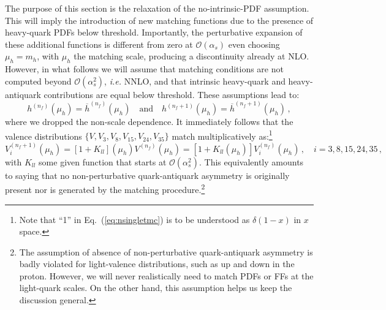 \documentclass[10pt,a4paper]{article}
\begin{document}
The purpose of this section is the relaxation of the no-intrinsic-PDF
assumption. This will imply the introduction of new matching functions
due to the presence of heavy-quark PDFs below threshold. Importantly,
the perturbative expansion of these additional functions is different
from zero at $\mathcal{O}(\alpha_s)$ even choosing $\mu_h=m_h$, with
$\mu_h$ the matching scale, producing a discontinuity already at NLO.
However, in what follows we will assume that matching conditions are
not computed beyond $\mathcal{O}(\alpha_s^2)$, \textit{i.e.}  NNLO,
and that intrinsic heavy-quark and heavy-antiquark contributions are
equal below threshold. These assumptions lead to:
\begin{equation}
h^{(n_f)}(\mu_h) = \overline{h}^{(n_f)}(\mu_h)\quad\mbox{and}\quad h^{(n_f+1)}(\mu_h) = \overline{h}^{(n_f+1)}(\mu_h)\,,
\end{equation}
where we dropped the non-scale dependence. It immediately follows that
the valence distributions $\{V,V_3,V_8,V_{15},V_{24},V_{35}\}$ match
multiplicatively as:\footnote{Note that ``1'' in
  Eq.~(\ref{eq:nsingletmc}) is to be understood as $\delta(1-x)$ in
  $x$ space.}
\begin{equation}\label{eq:nsingletmc}
V_i^{(n_f+1)}(\mu_h) = [1+K_{ll}](\mu_h) V^{(n_f)}(\mu_h) = [1+K_{ll}(\mu_h)] V_i^{(n_f)}(\mu_h)\,,\quad i = 3,8,15,24,35\,,
\end{equation}
with $K_{ll}$ some given function that starts at
$\mathcal{O}(\alpha_s^2)$. This equivalently amounts to saying that no
non-perturbative quark-antiquark asymmetry is originally present nor
is generated by the matching procedure.\footnote{The assumption of
  absence of non-perturbative quark-antiquark asymmetry is badly
  violated for light-valence distributions, such as up and down in the
  proton. However, we will never realistically need to match PDFs or
  FFs at the light-quark scales. On the other hand, this assumption
  helps us keep the discussion general.}
\end{document}
